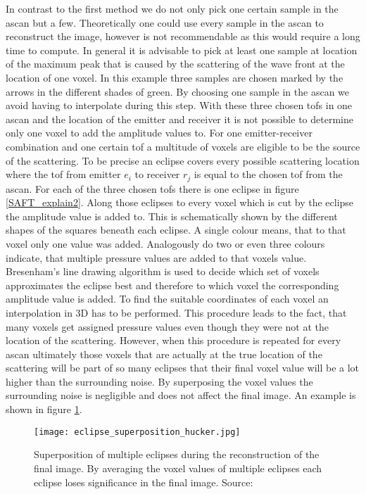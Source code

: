 In contrast to the first method we do not only pick one certain sample in the \ac{ascan} but a few. 
Theoretically one could use every sample in the \ac{ascan} to reconstruct the image, however is not recommendable as this would require a long time to compute. In general it is advisable to pick at least one sample at location of the maximum peak that is caused by the scattering of the wave front at the location of one voxel. In this example three samples are chosen marked by the arrows in the different shades of green. By choosing one sample in the \ac{ascan} we avoid having to interpolate during this step.
With these three chosen \acp{tof} in one \ac{ascan} and the location of the emitter and receiver it is not possible to determine only one voxel to add the amplitude values to. For one emitter-receiver combination and one certain \ac{tof} a multitude of voxels are eligible to be the source of the scattering. To be precise an eclipse covers every possible scattering location where the \ac{tof} from emitter $e_i$ to receiver $r_j$ is equal to the chosen \ac{tof} from the \ac{ascan}. For each of the three chosen \acp{tof} there is one eclipse in figure \ref{SAFT_explain2}. Along those eclipses to every voxel which is cut by the eclipse the amplitude value is added to. This is schematically shown by the different shapes of the squares beneath each eclipse. A single colour means, that to that voxel only one value was added. Analogously do two or even three colours indicate, that multiple pressure values are added to that voxels value. 
Bresenham's line drawing algorithm \cite{Bresenham2010AlgorithmPlotter} is used to decide which set of voxels approximates the eclipse best and therefore to which voxel the corresponding amplitude value is added. To find the suitable coordinates of each voxel an interpolation in 3D has to be performed.
This procedure leads to the fact, that many voxels get assigned pressure values even though they were not at the location of the scattering. However, when this procedure is repeated for every \ac{ascan} ultimately those voxels that are actually at the true location of the scattering will be part of so many eclipses that their final voxel value will be a lot higher than the surrounding noise. By superposing the voxel values the surrounding noise is negligible and does not affect the final image. An example is shown in figure \ref{eclipse_super}.


\begin{figure}[H]
    \centering
    \texttt{[image: eclipse\_superposition\_hucker.jpg]}
    \caption{ Superposition of multiple eclipses during the reconstruction of the final image. By averaging the voxel values of multiple eclipses each eclipse loses significance in the final image.
    Source: \cite{PatrickHucker2014EvaluationRuckstreumodells}}
    \label{eclipse_super}
\end{figure}


